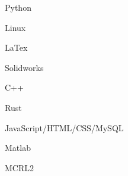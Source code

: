     
\begin{cSection}{\textwidth}{0.5\textwidth}{0.48\textwidth}
{%
\begin{cSubsection}{}
  \begin{experienceItem} {}{Python}{}{} \end{experienceItem}
  \begin{experienceItem} {\hphantom{}}{Linux}{}{} \end{experienceItem}
  \begin{experienceItem} {\hphantom{}}{LaTex}{}{} \end{experienceItem}
  \begin{experienceItem} {\hphantom{}}{Solidworks}{}{} \end{experienceItem}

  \begin{experienceItem} {}{C++}{}{} \end{experienceItem}
  \begin{experienceItem} {\hphantom{}}{Rust}{}{} \end{experienceItem}
  \begin{experienceItem} {\hphantom{}}{JavaScript/HTML/CSS/MySQL}{}{} \end{experienceItem}
  \begin{experienceItem} {\hphantom{}}{Matlab}{}{} \end{experienceItem}
  \begin{experienceItem} {\hphantom{}}{MCRL2}{}{} \end{experienceItem}
\end{cSubsection}

}
\end{cSection}
